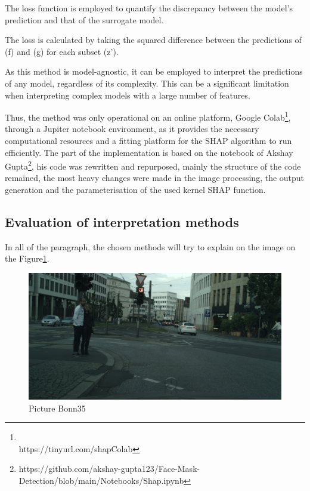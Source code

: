 The loss function is employed to quantify the discrepancy between the model's prediction and that of the surrogate model.

The loss is calculated by taking the squared difference between the predictions of (f) and (g) for each subset (z').



As this method is model-agnostic, it can be employed to interpret the predictions of any model, regardless of its complexity.
This can be a significant limitation when interpreting complex models with a large number of features.

Thus, the method was only operational on an online platform, Google
Colab\footnote{\\https://tinyurl.com/shapColab}, through a Jupiter notebook environment, as it provides
the necessary computational resources and a fitting platform for the SHAP algorithm to run efficiently.
The part of the implementation is based on the notebook of Akshay Gupta\footnote{https://github.com/akshay-gupta123/Face-Mask-Detection/blob/main/Notebooks/Shap.ipynb}, his code was rewritten and repurposed, mainly the structure of the code remained, the most heavy changes were made in the image processing, the output generation and the parameterisation of the used kernel SHAP function.

\subsection{Evaluation of interpretation methods}\label{subsec:evaluation-of-interpretation-methods}


In all of the paragraph, the chosen methods will try to explain on the image on the Figure\ref{fig:bonn35}.
\begin{figure}[h]
    \centering
    \includegraphics[width=1\linewidth]{figures/bonn_000035_000019_leftImg8bit_original}
    \caption{Picture Bonn35 }
    \label{fig:bonn35}
\end{figure}

